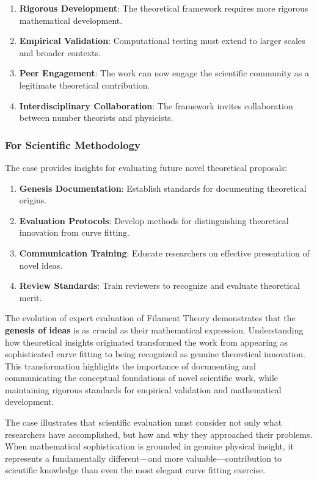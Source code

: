 \begin{enumerate}
\item \textbf{Rigorous Development}: The theoretical framework requires more rigorous mathematical development.
\item \textbf{Empirical Validation}: Computational testing must extend to larger scales and broader contexts.
\item \textbf{Peer Engagement}: The work can now engage the scientific community as a legitimate theoretical contribution.
\item \textbf{Interdisciplinary Collaboration}: The framework invites collaboration between number theorists and physicists.
\end{enumerate}

\subsubsection{For Scientific Methodology}

The case provides insights for evaluating future novel theoretical proposals:

\begin{enumerate}
\item \textbf{Genesis Documentation}: Establish standards for documenting theoretical origins.
\item \textbf{Evaluation Protocols}: Develop methods for distinguishing theoretical innovation from curve fitting.
\item \textbf{Communication Training}: Educate researchers on effective presentation of novel ideas.
\item \textbf{Review Standards}: Train reviewers to recognize and evaluate theoretical merit.
\end{enumerate}

\begin{conclusion}
The evolution of expert evaluation of Filament Theory demonstrates that the \textbf{genesis of ideas} is as crucial as their mathematical expression. Understanding how theoretical insights originated transformed the work from appearing as sophisticated curve fitting to being recognized as genuine theoretical innovation. This transformation highlights the importance of documenting and communicating the conceptual foundations of novel scientific work, while maintaining rigorous standards for empirical validation and mathematical development.

The case illustrates that scientific evaluation must consider not only what researchers have accomplished, but how and why they approached their problems. When mathematical sophistication is grounded in genuine physical insight, it represents a fundamentally different—and more valuable—contribution to scientific knowledge than even the most elegant curve fitting exercise.
\end{conclusion}
